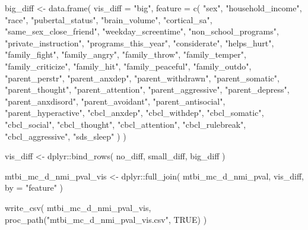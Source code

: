 \documentclass[
  letterpaper,
  DIV=11,
  numbers=noendperiod]{scrreprt}
\newenvironment{Shaded}{\begin{snugshade}}{\end{snugshade}}
\newcommand{\AttributeTok}[1]{\textcolor[rgb]{0.40,0.45,0.13}{#1}}
\newcommand{\ConstantTok}[1]{\textcolor[rgb]{0.56,0.35,0.01}{#1}}
\newcommand{\FunctionTok}[1]{\textcolor[rgb]{0.28,0.35,0.67}{#1}}
\newcommand{\NormalTok}[1]{\textcolor[rgb]{0.00,0.23,0.31}{#1}}
\newcommand{\OtherTok}[1]{\textcolor[rgb]{0.00,0.23,0.31}{#1}}
\newcommand{\SpecialCharTok}[1]{\textcolor[rgb]{0.37,0.37,0.37}{#1}}
\newcommand{\StringTok}[1]{\textcolor[rgb]{0.13,0.47,0.30}{#1}}
\begin{document}
\begin{Shaded}
\begin{Highlighting}[]
\NormalTok{big\_diff }\OtherTok{\textless{}{-}} \FunctionTok{data.frame}\NormalTok{(}
    \AttributeTok{vis\_diff =} \StringTok{"big"}\NormalTok{,}
    \AttributeTok{feature =} \FunctionTok{c}\NormalTok{(}
        \StringTok{"sex"}\NormalTok{,}
        \StringTok{"household\_income"}\NormalTok{,}
        \StringTok{"race"}\NormalTok{,}
        \StringTok{"pubertal\_status"}\NormalTok{,}
        \StringTok{"brain\_volume"}\NormalTok{,}
        \StringTok{"cortical\_sa"}\NormalTok{,}
        \StringTok{"same\_sex\_close\_friend"}\NormalTok{,}
        \StringTok{"weekday\_screentime"}\NormalTok{,}
        \StringTok{"non\_school\_programs"}\NormalTok{,}
        \StringTok{"private\_instruction"}\NormalTok{,}
        \StringTok{"programs\_this\_year"}\NormalTok{,}
        \StringTok{"considerate"}\NormalTok{,}
        \StringTok{"helps\_hurt"}\NormalTok{,}
        \StringTok{"family\_fight"}\NormalTok{,}
        \StringTok{"family\_angry"}\NormalTok{,}
        \StringTok{"family\_throw"}\NormalTok{,}
        \StringTok{"family\_temper"}\NormalTok{,}
        \StringTok{"family\_criticize"}\NormalTok{,}
        \StringTok{"family\_hit"}\NormalTok{,}
        \StringTok{"family\_peaceful"}\NormalTok{,}
        \StringTok{"family\_outdo"}\NormalTok{,}
        \StringTok{"parent\_perstr"}\NormalTok{,}
        \StringTok{"parent\_anxdep"}\NormalTok{,}
        \StringTok{"parent\_withdrawn"}\NormalTok{,}
        \StringTok{"parent\_somatic"}\NormalTok{,}
        \StringTok{"parent\_thought"}\NormalTok{,}
        \StringTok{"parent\_attention"}\NormalTok{,}
        \StringTok{"parent\_aggressive"}\NormalTok{,}
        \StringTok{"parent\_depress"}\NormalTok{,}
        \StringTok{"parent\_anxdisord"}\NormalTok{,}
        \StringTok{"parent\_avoidant"}\NormalTok{,}
        \StringTok{"parent\_antisocial"}\NormalTok{,}
        \StringTok{"parent\_hyperactive"}\NormalTok{,}
        \StringTok{"cbcl\_anxdep"}\NormalTok{,}
        \StringTok{"cbcl\_withdep"}\NormalTok{,}
        \StringTok{"cbcl\_somatic"}\NormalTok{,}
        \StringTok{"cbcl\_social"}\NormalTok{,}
        \StringTok{"cbcl\_thought"}\NormalTok{,}
        \StringTok{"cbcl\_attention"}\NormalTok{,}
        \StringTok{"cbcl\_rulebreak"}\NormalTok{,}
        \StringTok{"cbcl\_aggressive"}\NormalTok{,}
        \StringTok{"sds\_sleep"}
\NormalTok{    )}
\NormalTok{)}

\NormalTok{vis\_diff }\OtherTok{\textless{}{-}}\NormalTok{ dplyr}\SpecialCharTok{::}\FunctionTok{bind\_rows}\NormalTok{(}
\NormalTok{    no\_diff,}
\NormalTok{    small\_diff,}
\NormalTok{    big\_diff}
\NormalTok{)}

\NormalTok{mtbi\_mc\_d\_nmi\_pval\_vis }\OtherTok{\textless{}{-}}\NormalTok{ dplyr}\SpecialCharTok{::}\FunctionTok{full\_join}\NormalTok{(}
\NormalTok{    mtbi\_mc\_d\_nmi\_pval,}
\NormalTok{    vis\_diff,}
    \AttributeTok{by =} \StringTok{"feature"}
\NormalTok{)}

\FunctionTok{write\_csv}\NormalTok{(}
\NormalTok{    mtbi\_mc\_d\_nmi\_pval\_vis,}
    \FunctionTok{proc\_path}\NormalTok{(}\StringTok{"mtbi\_mc\_d\_nmi\_pval\_vis.csv"}\NormalTok{, }\ConstantTok{TRUE}\NormalTok{)}
\NormalTok{)}
\end{Highlighting}
\end{Shaded}
\end{document}
